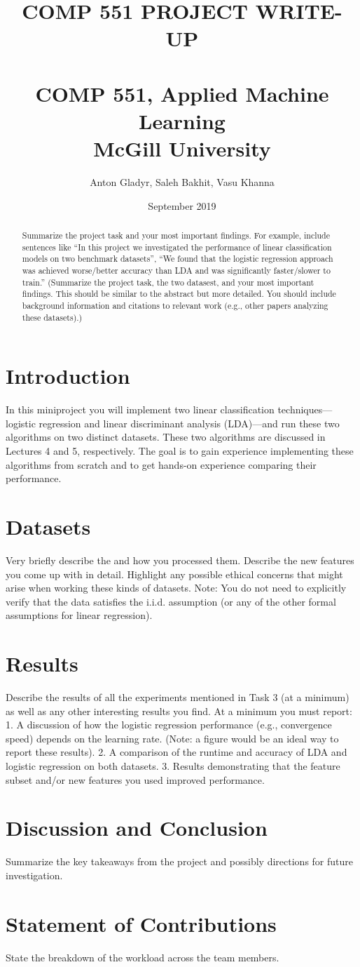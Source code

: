 \documentclass[11 pt, twocolumn]{article}
\title{\textbf{COMP 551 PROJECT WRITE-UP
\\~\\{\Large COMP 551, Applied Machine Learning
\\McGill University}}}
\author{Anton Gladyr, Saleh Bakhit, Vasu Khanna }
\date{September 2019}
\begin{document}
\maketitle

\begin{abstract}
Summarize the project task and your most important findings. For example, include sentences like “In this project we investigated the performance of linear classification models on two benchmark
datasets”, “We found that the logistic regression approach was achieved worse/better accuracy than LDA and was
significantly faster/slower to train.” (Summarize the project task, the two datasest, and your most important findings. This
should be similar to the abstract but more detailed. You should include background information and citations to
relevant work (e.g., other papers analyzing these datasets).)
\end{abstract}

\section{Introduction}
In this miniproject you will implement two linear classification techniques—logistic regression and linear discriminant analysis (LDA)—and run these two algorithms on two distinct datasets. These two algorithms are discussed in Lectures 4 and 5, respectively. The goal is to gain experience implementing these algorithms from scratch and to get hands-on experience comparing their performance.

\section{Datasets}
Very briefly describe the and how you processed them. Describe the new features you come up with in detail. Highlight any possible ethical concerns that might arise when working these kinds of datasets. Note: You do not need to explicitly verify that the data satisfies the i.i.d. assumption (or any of the other formal assumptions for linear regression).

\section{Results}
Describe the results of all the experiments mentioned in
Task 3 (at a minimum) as well as any other interesting results you find. At a minimum you must report:
1. A discussion of how the logistic regression performance (e.g., convergence speed) depends on the learning rate.
(Note: a figure would be an ideal way to report these results).
2. A comparison of the runtime and accuracy of LDA and logistic regression on both datasets.
3. Results demonstrating that the feature subset and/or new features you used improved performance.

\section{Discussion and Conclusion}
Summarize the key takeaways from the project and possibly directions for future investigation.

\section{Statement of Contributions}
State the breakdown of the workload across the team members.



\end{document}
